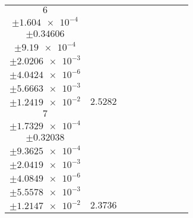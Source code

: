\documentclass[8pt]{article}
\begin{document}
\begin{longtable}[l]{c c c c c c c c c}
$\num{6}$ & \begin{tabular}[c]{@{}c@{}}$\num{2.967e-2}$ \\ $\pm\num{1.604e-4}$\end{tabular} & \begin{tabular}[c]{@{}c@{}}$\num{0.71453}$ \\ $\pm\num{0.34606}$\end{tabular} & \begin{tabular}[c]{@{}c@{}}$\num{6.9451}$ \\ $\pm\num{9.19e-4}$\end{tabular} & \begin{tabular}[c]{@{}c@{}}$\num{737.5}$ \\ $\pm\num{2.0206e-3}$\end{tabular} & \begin{tabular}[c]{@{}c@{}}$\num{1.4754}$ \\ $\pm\num{4.0424e-6}$\end{tabular} & \begin{tabular}[c]{@{}c@{}}$\num{1.1666}$ \\ $\pm\num{5.6663e-3}$\end{tabular} & \begin{tabular}[c]{@{}c@{}}$\num{4.1258}$ \\ $\pm\num{1.2419e-2}$\end{tabular} & $\num{2.5282}$\\
$\num{7}$ & \begin{tabular}[c]{@{}c@{}}$\num{3.0153e-2}$ \\ $\pm\num{1.7329e-4}$\end{tabular} & \begin{tabular}[c]{@{}c@{}}$\num{0.46839}$ \\ $\pm\num{0.32038}$\end{tabular} & \begin{tabular}[c]{@{}c@{}}$\num{7.4055}$ \\ $\pm\num{9.3625e-4}$\end{tabular} & \begin{tabular}[c]{@{}c@{}}$\num{737.97}$ \\ $\pm\num{2.0419e-3}$\end{tabular} & \begin{tabular}[c]{@{}c@{}}$\num{1.4763}$ \\ $\pm\num{4.0849e-6}$\end{tabular} & \begin{tabular}[c]{@{}c@{}}$\num{1.1818}$ \\ $\pm\num{5.5578e-3}$\end{tabular} & \begin{tabular}[c]{@{}c@{}}$\num{4.1345}$ \\ $\pm\num{1.2147e-2}$\end{tabular} & $\num{2.3736}$\\

\end{longtable}
\end{document}
